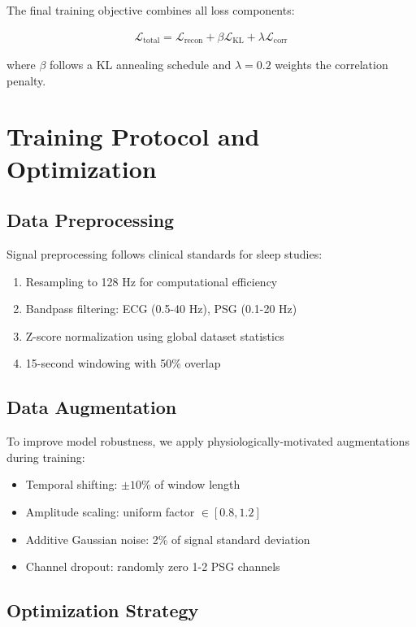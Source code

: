 \documentclass[11pt]{article}
\begin{document}
The final training objective combines all loss components:

\begin{align}
\mathcal{L}_{\text{total}} = \mathcal{L}_{\text{recon}} + \beta \mathcal{L}_{\text{KL}} + \lambda \mathcal{L}_{\text{corr}}
\end{align}

where $\beta$ follows a KL annealing schedule and $\lambda = 0.2$ weights the correlation penalty.

\section{Training Protocol and Optimization}

\subsection{Data Preprocessing}

Signal preprocessing follows clinical standards for sleep studies:

\begin{enumerate}
\item Resampling to 128 Hz for computational efficiency
\item Bandpass filtering: ECG (0.5-40 Hz), PSG (0.1-20 Hz)
\item Z-score normalization using global dataset statistics
\item 15-second windowing with 50\% overlap
\end{enumerate}

\subsection{Data Augmentation}

To improve model robustness, we apply physiologically-motivated augmentations during training:

\begin{itemize}
\item Temporal shifting: $\pm 10\%$ of window length
\item Amplitude scaling: uniform factor $\in [0.8, 1.2]$
\item Additive Gaussian noise: 2\% of signal standard deviation
\item Channel dropout: randomly zero 1-2 PSG channels
\end{itemize}

\subsection{Optimization Strategy}
\end{document}
